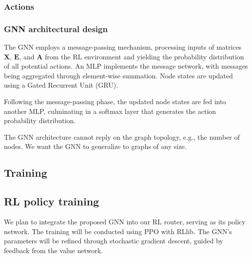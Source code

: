 \documentclass[letterpaper]{article}
\begin{document}
\subsubsection{Actions}
\subsubsection{GNN architectural design}
The GNN employs a message-passing mechanism, processing inputs of matrices $\mathbf{X}$, $\mathbf{E}$, and $\mathbf{A}$ from the RL environment and yielding the probability distribution of all potential actions. An MLP implements the message network, with messages being aggregated through element-wise summation. Node states are updated using a Gated Recurrent Unit (GRU). 

Following the message-passing phase, the updated node states are fed into another MLP, culminating in a softmax layer that generates the action probability distribution.


The GNN architecture cannot reply on the graph topology, e.g., the number of nodes. We want the GNN to generalize to graphs of any size. 
\subsection{Training}


\subsection{RL policy training}
We plan to integrate the proposed GNN into our RL router, serving as its policy network. The training will be conducted using PPO with RLlib. The GNN's parameters will be refined through stochastic gradient descent, guided by feedback from the value network.


\end{document}
